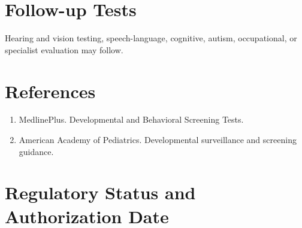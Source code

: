 \section*{Follow-up Tests} Hearing and vision testing, speech-language, cognitive, autism, occupational, or specialist evaluation may follow.
\section*{References} \begin{enumerate}\item MedlinePlus. Developmental and Behavioral Screening Tests.\item American Academy of Pediatrics. Developmental surveillance and screening guidance.\end{enumerate}
\clearpage\section*{Regulatory Status and Authorization Date}\clearpage
